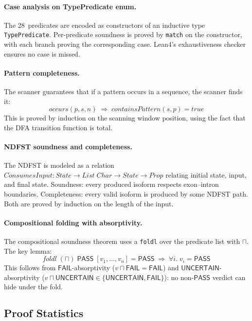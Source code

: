 \documentclass[sigplan,10pt,manuscript,review,anonymous]{acmart}
\newcommand{\PASS}{\ensuremath{\mathsf{PASS}}\xspace}
\newcommand{\FAIL}{\ensuremath{\mathsf{FAIL}}\xspace}
\newcommand{\UNCERTAIN}{\ensuremath{\mathsf{UNCERTAIN}}\xspace}
\newcommand{\tand}{\sqcap}
\begin{document}
\paragraph{Case analysis on TypePredicate enum.}
The 28~predicates are encoded as constructors of an inductive type
\texttt{TypePredicate}.
Per-predicate soundness is proved by \texttt{match} on the constructor,
with each branch proving the corresponding case.
Lean4's exhaustiveness checker ensures no case is missed.

\paragraph{Pattern completeness.}
The scanner guarantees that if a pattern occurs in a sequence, the
scanner finds it:
\[
  \mathit{occurs}(p, s, n) \;\Rightarrow\;
  \mathit{containsPattern}(s, p) = \mathit{true}
\]
This is proved by induction on the scanning window position,
using the fact that the DFA transition function is total.

\paragraph{NDFST soundness and completeness.}
The NDFST is modeled as a relation
$\mathit{ConsumesInput} : \mathit{State} \to \mathit{List}\;\mathit{Char}
 \to \mathit{State} \to \mathit{Prop}$
relating initial state, input, and final state.
Soundness: every produced isoform respects exon--intron boundaries.
Completeness: every valid isoform is produced by some NDFST path.
Both are proved by induction on the length of the input.

\paragraph{Compositional folding with absorptivity.}
The compositional soundness theorem uses a \texttt{foldl} over the
predicate list with $\tand$.
The key lemma:
\[
  \mathit{foldl}\;(\tand)\;\PASS\;[v_1, \ldots, v_n] = \PASS
  \;\Longrightarrow\;
  \forall i.\; v_i = \PASS
\]
This follows from \FAIL-absorptivity ($v \tand \FAIL = \FAIL$) and
\UNCERTAIN-absorptivity ($v \tand \UNCERTAIN \in \{\UNCERTAIN, \FAIL\}$):
no non-\PASS{} verdict can hide under the fold.

\subsection{Proof Statistics}\label{sec:proof-stats}
\end{document}
